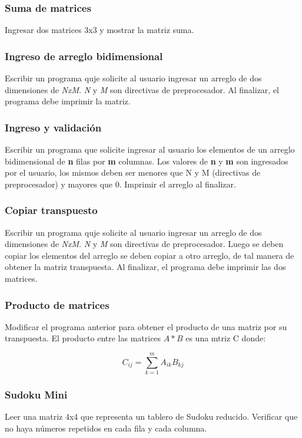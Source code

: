\subsubsection{Suma de matrices}
Ingresar dos matrices 3x3 y mostrar la matriz suma.

\subsubsection{Ingreso de arreglo bidimensional}
Escribir un programa quje solicite al usuario ingresar un arreglo de dos dimensiones de \textit{NxM}. \textit{N} y \textit{M} son directivas de preprocesador. Al finalizar, el programa debe imprimir la matriz.

\subsubsection{Ingreso y validación}
Escribir un programa que solicite ingresar al usuario los elementos de un arreglo bidimensional de \textbf{n} filas por  \textbf{m} columnas. Los valores de \textbf{n} y \textbf{m} son ingresados por el usuario, los mismos deben ser menores que N y M (directivas de preprocesador) y mayores que 0. Imprimir el arreglo al finalizar.

\subsubsection{Copiar transpuesto}
Escribir un programa quje solicite al usuario ingresar un arreglo de dos dimensiones de \textit{NxM}. \textit{N} y \textit{M} son directivas de preprocesador. Luego se deben copiar los elementos del arreglo se deben copiar a otro arreglo, de tal manera de obtener la matriz transpuesta.
Al finalizar, el programa debe imprimir las dos matrices.

\subsubsection{Producto de matrices}
Modificar el programa anterior para obtener el producto de una matriz por su transpuesta. El producto entre las matrices $A*B$ es una mtriz C donde:

$$C_{ij}=\sum_{k=1}^{m}{A_{ik}B_{kj}} $$

\subsubsection{Sudoku Mini}
Leer una matriz 4x4 que representa un tablero de Sudoku reducido. Verificar que no haya números repetidos en cada fila y cada columna.


